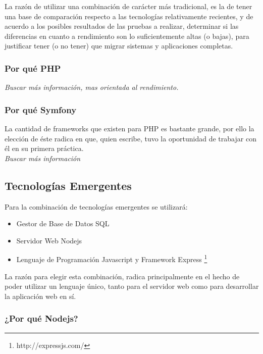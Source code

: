 La razón de utilizar una combinación de carácter más tradicional, es la de tener una base 
de comparación respecto a las tecnologías relativamente recientes, y de acuerdo a los
posibles resultados de las pruebas a realizar, determinar si las diferencias en cuanto a 
rendimiento son lo suficientemente altas (o bajas), para justificar tener (o no tener) que 
migrar sistemas y aplicaciones completas.\\


\subsubsection{Por qué PHP}
\textit{Buscar más información, mas orientada al rendimiento.}


\subsubsection{Por qué Symfony}

La cantidad de frameworks que existen para PHP es bastante grande, por ello la elección de éste 
radica en que, quien escribe, tuvo la oportunidad de trabajar con él en su primera práctica.\\

\textit{Buscar más información}

\subsection{Tecnologías Emergentes}

Para la combinación de tecnologías emergentes se utilizará:

\begin{itemize}
 \item Gestor de Base de Datos SQL
 \item Servidor Web Nodejs
 \item Lenguaje de Programación Javascript y Framework Express \footnote{http://expressjs.com/}
\end{itemize}

La razón para elegir esta combinación, radica principalmente en el hecho de poder utilizar
un lenguaje único, tanto para el servidor web como para desarrollar la aplicación web en sí.\\




\subsubsection{¿Por qué Nodejs?}

